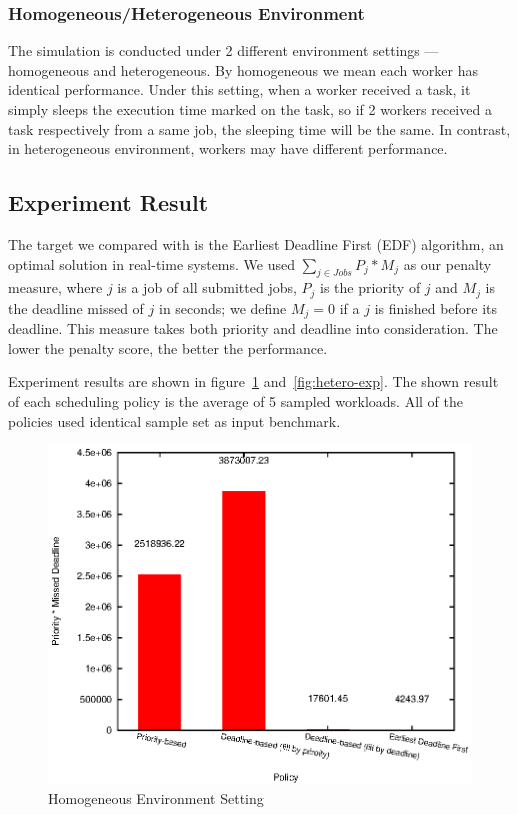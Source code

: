 \subsubsection{Homogeneous/Heterogeneous Environment}

The simulation is conducted under 2 different environment settings ---
homogeneous and heterogeneous.
By homogeneous we mean each worker has identical performance.
Under this setting, when a worker received a task, it simply sleeps the
execution time marked on the task, so if 2 workers received a task
respectively from a same job, the sleeping time will be the same.
In contrast, in heterogeneous environment, workers may have different
performance.

\subsection{Experiment Result}

The target we compared with is the Earliest Deadline First (EDF)
algorithm, an optimal solution in real-time systems.
We used $\sum_{j \in Jobs} P_j * M_j$ as our penalty measure, where $j$
is a job of all submitted jobs, $P_j$ is the priority of $j$ and $M_j$
is the deadline missed of $j$ in seconds; we define $M_j = 0$ if a $j$
is finished before its deadline.
This measure takes both priority and deadline into consideration.
The lower the penalty score, the better the performance.

Experiment results are shown in figure~\ref{fig:homo-exp}
and~\ref{fig:hetero-exp}.
The shown result of each scheduling policy is the average of 5 sampled
workloads.
All of the policies used identical sample set as input benchmark.

\begin{figure}[htbp]
  \centering
  \includegraphics[width=\textwidth,height=0.7\textheight,keepaspectratio]{figures/homo.eps}
  \caption{Homogeneous Environment Setting}
  \label{fig:homo-exp}
\end{figure}


